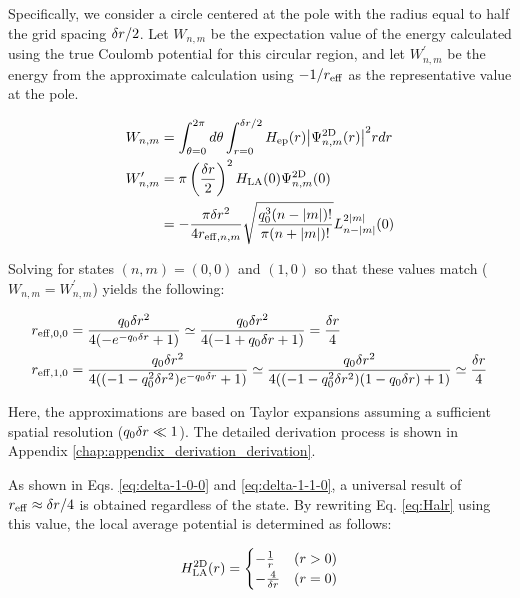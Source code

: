 \documentclass[jctc-draft.tex]{subfiles}
\begin{document}
Specifically, we consider a circle centered at the pole with the radius equal to
half the grid spacing $\delta r/2$. Let $W_{n,m}$ be the expectation value of the
energy calculated using the true Coulomb potential for this circular region, and
let $W_{n,m}^\prime$ be the energy from the approximate calculation using
$-1/r_{\mathrm{eff}}$ as the representative value at the pole.

\begin{align}
    W_{n,m}&=\int_{\theta=0}^{2\pi}d\theta\int_{r=0}^{\delta r/2}
    H_{\mathrm{ep}}(r){\left| \Psi^{\mathrm{2D}}_{n,m}(r) \right|}^2r dr\\
    W_{n,m}^\prime&=\pi\left(\frac{\delta r}{2}\right)^2
    H_{\mathrm{LA}}(0)\Psi^{\mathrm{2D}}_{n,m}(0) \notag \\
    &=-\frac{\pi\delta r^2}{4r_{\mathrm{eff},n,m}}
    \sqrt{\frac{q_0^3(n-{\left| m \right|})!}{\pi(n+{\left| m \right|})!}}
    L_{n-{\left| m \right|}}^{2{\left| m \right|}}(0)
\end{align}

Solving for states $(n,m)=(0,0)$ and $(1,0)$ so that these values match
($W_{n,m}=W_{n,m}^\prime$) yields the following:

\begin{align}
    r_{\mathrm{eff},0,0} &=\frac{q_0\delta r^2}{4(-e^{-q_0\delta r}+1)}
    \simeq \frac{q_0\delta r^2}{4(-1+q_0\delta r+1)}=\frac{\delta r}{4}
    \label{eq:delta-1-0-0}\\
    r_{\mathrm{eff},1,0} &=\frac{q_0\delta r^2}{4((-1-q_0^2\delta r^2)e^{-q_0\delta r}+1)}
    \simeq \frac{q_0\delta r^2}{4((-1-q_0^2\delta r^2)(1-q_0\delta r)+1)}
    \simeq\frac{\delta r}{4}
    \label{eq:delta-1-1-0}
\end{align}

Here, the approximations are based on Taylor expansions assuming a sufficient
spatial resolution ($q_0\delta r \ll 1$). The detailed derivation process is shown
in Appendix \ref{chap:appendix_derivation_derivation}.

As shown in Eqs. \eqref{eq:delta-1-0-0} and \eqref{eq:delta-1-1-0}, a universal
result of $r_{\mathrm{eff}} \approx \delta r/4$ is obtained regardless of the state. By
rewriting Eq. \eqref{eq:Halr} using this value, the local average potential is
determined as follows:

\begin{equation}
H_{\mathrm{LA}}^{\mathrm{2D}}(r) = \begin{cases}
-\frac{1}{r} & (r>0) \\
-\frac{4}{\delta r} & (r=0)
\end{cases}
\label{eq:Hlar2d-fixed}
\end{equation}
\end{document}
